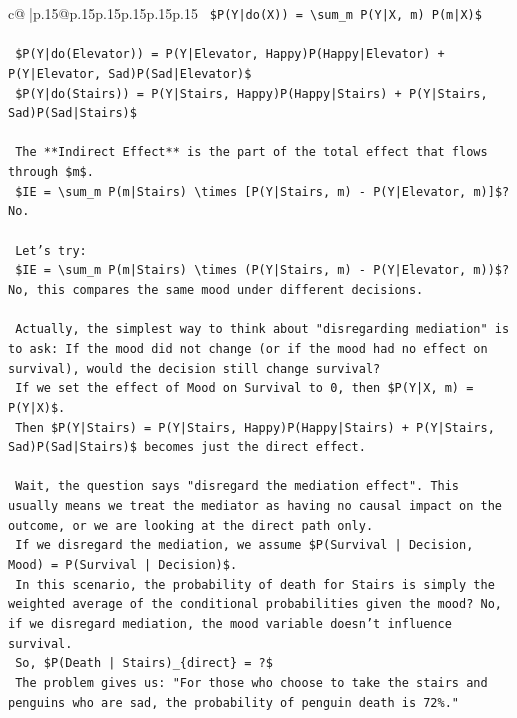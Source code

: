 \documentclass{article}
\begin{document}
{\begin{supertabular}{c@{$\;$}|p{.15\linewidth}@{}p{.15\linewidth}p{.15\linewidth}p{.15\linewidth}p{.15\linewidth}p{.15\linewidth}}
{{{\texttt{    \$P(Y|do(X)) = \textbackslash{}sum\_m P(Y|X, m) P(m|X)\$} \\
\\ 
\texttt{    \$P(Y|do(Elevator)) = P(Y|Elevator, Happy)P(Happy|Elevator) + P(Y|Elevator, Sad)P(Sad|Elevator)\$} \\
\texttt{    \$P(Y|do(Stairs)) = P(Y|Stairs, Happy)P(Happy|Stairs) + P(Y|Stairs, Sad)P(Sad|Stairs)\$} \\
\\ 
\texttt{    The **Indirect Effect** is the part of the total effect that flows through \$m\$.} \\
\texttt{    \$IE = \textbackslash{}sum\_m P(m|Stairs) \textbackslash{}times {[}P(Y|Stairs, m) {-} P(Y|Elevator, m){]}\$? No.} \\
\\ 
\texttt{    Let's try:} \\
\texttt{    \$IE = \textbackslash{}sum\_m P(m|Stairs) \textbackslash{}times (P(Y|Stairs, m) {-} P(Y|Elevator, m))\$? No, this compares the same mood under different decisions.} \\
\\ 
\texttt{    Actually, the simplest way to think about "disregarding mediation" is to ask: If the mood did not change (or if the mood had no effect on survival), would the decision still change survival?} \\
\texttt{    If we set the effect of Mood on Survival to 0, then \$P(Y|X, m) = P(Y|X)\$.} \\
\texttt{    Then \$P(Y|Stairs) = P(Y|Stairs, Happy)P(Happy|Stairs) + P(Y|Stairs, Sad)P(Sad|Stairs)\$ becomes just the direct effect.} \\
\\ 
\texttt{    Wait, the question says "disregard the mediation effect". This usually means we treat the mediator as having no causal impact on the outcome, or we are looking at the direct path only.} \\
\texttt{    If we disregard the mediation, we assume \$P(Survival | Decision, Mood) = P(Survival | Decision)\$.} \\
\texttt{    In this scenario, the probability of death for Stairs is simply the weighted average of the conditional probabilities given the mood? No, if we disregard mediation, the mood variable doesn't influence survival.} \\
\texttt{    So, \$P(Death | Stairs)\_\{direct\} = ?\$} \\
\texttt{    The problem gives us: "For those who choose to take the stairs and penguins who are sad, the probability of penguin death is 72\%."} \\
}}}
\end{supertabular}}
\end{document}
